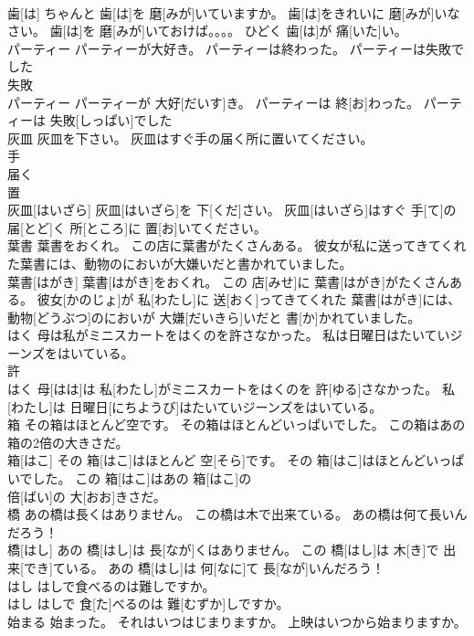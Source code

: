 \documentclass[8pt]{extreport}
\begin{document}
\begin{CJK}{UTF8}{min}
\\	歯[は] ちゃんと 歯[は]を 磨[みが]いていますか。 歯[は]をきれいに 磨[みが]いなさい。 歯[は]を 磨[みが]いておけば。。。。 ひどく 歯[は]が 痛[いた]い。
\\	パーティー パーティーが大好き。 パーティーは終わった。 パーティーは失敗でした	
\\	失敗 
\\	パーティー パーティーが 大好[だいす]き。 パーティーは 終[お]わった。 パーティーは 失敗[しっぱい]でした
\\	灰皿 灰皿を下さい。 灰皿はすぐ手の届く所に置いてください。	
\\	手 
\\	届く 
\\	置 
\\	灰皿[はいざら] 灰皿[はいざら]を 下[くだ]さい。 灰皿[はいざら]はすぐ 手[て]の 届[とど]く 所[ところ]に 置[お]いてください。
\\	葉書 葉書をおくれ。 この店に葉書がたくさんある。 彼女が私に送ってきてくれた葉書には、動物のにおいが大嫌いだと書かれていました。	
\\	葉書[はがき] 葉書[はがき]をおくれ。 この 店[みせ]に 葉書[はがき]がたくさんある。 彼女[かのじょ]が 私[わたし]に 送[おく]ってきてくれた 葉書[はがき]には、 動物[どうぶつ]のにおいが 大嫌[だいきら]いだと 書[か]かれていました。
\\	はく 母は私がミニスカートをはくのを許さなかった。 私は日曜日はたいていジーンズをはいている。	
\\	許 
\\	はく 母[はは]は 私[わたし]がミニスカートをはくのを 許[ゆる]さなかった。 私[わたし]は 日曜日[にちようび]はたいていジーンズをはいている。
\\	箱 その箱はほとんど空です。 その箱はほとんどいっぱいでした。 この箱はあの箱の2倍の大きさだ。	
\\	箱[はこ] その 箱[はこ]はほとんど 空[そら]です。 その 箱[はこ]はほとんどいっぱいでした。 この 箱[はこ]はあの 箱[はこ]の 
\\	倍[ばい]の 大[おお]きさだ。
\\	橋 あの橋は長くはありません。 この橋は木で出来ている。 あの橋は何て長いんだろう！	
\\	橋[はし] あの 橋[はし]は 長[なが]くはありません。 この 橋[はし]は 木[き]で 出来[でき]ている。 あの 橋[はし]は 何[なに]て 長[なが]いんだろう！
\\	はし はしで食べるのは難しですか。	
\\	はし はしで 食[た]べるのは 難[むずか]しですか。
\\	始まる 始まった。 それはいつはじまりますか。 上映はいつから始まりますか。	

\end{CJK}
\end{document}
